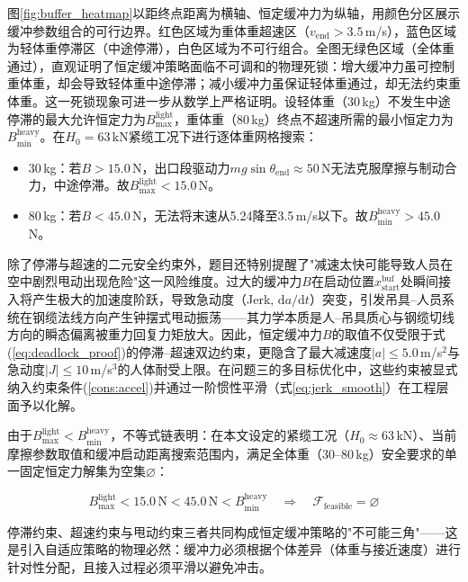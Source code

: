 \documentclass[12pt,a4paper]{ctexart}
\begin{document}
图\ref{fig:buffer_heatmap}以距终点距离为横轴、恒定缓冲力为纵轴，用颜色分区展示缓冲参数组合的可行边界。红色区域为重体重超速区（$v_{\text{end}}>3.5$\,m/s），蓝色区域为轻体重停滞区（中途停滞），白色区域为不可行组合。全图无绿色区域（全体重通过），直观证明了恒定缓冲策略面临不可调和的物理死锁：增大缓冲力虽可控制重体重，却会导致轻体重中途停滞；减小缓冲力虽保证轻体重通过，却无法约束重体重。这一死锁现象可进一步从数学上严格证明。设轻体重（30\,kg）不发生中途停滞的最大允许恒定力为$B_{\max}^{\text{light}}$，重体重（80\,kg）终点不超速所需的最小恒定力为$B_{\min}^{\text{heavy}}$。在$H_0=63$\,kN紧缆工况下进行逐体重网格搜索：

\begin{itemize}
  \item 30\,kg：若$B>15.0$\,N，出口段驱动力$mg\sin\theta_{\text{end}} \approx 50$\,N无法克服摩擦与制动合力，中途停滞。故$B_{\max}^{\text{light}} < 15.0$\,N。
  \item 80\,kg：若$B<45.0$\,N，无法将末速从5.24降至3.5\,m/s以下。故$B_{\min}^{\text{heavy}} > 45.0$\,N。
\end{itemize}

除了停滞与超速的二元安全约束外，题目还特别提醒了"减速太快可能导致人员在空中剧烈甩动出现危险"这一风险维度。过大的缓冲力$B$在启动位置$x_{\text{start}}^{\text{buf}}$处瞬间接入将产生极大的加速度阶跃，导致急动度（Jerk, $\mathrm{d}a/\mathrm{d}t$）突变，引发吊具--人员系统在钢缆法线方向产生钟摆式甩动振荡——其力学本质是人--吊具质心与钢缆切线方向的瞬态偏离被重力回复力矩放大。因此，恒定缓冲力$B$的取值不仅受限于式(\ref{eq:deadlock_proof})的停滞--超速双边约束，更隐含了最大减速度$|a|\leq 5.0$\,m/s$^2$与急动度$|J|\leq 10$\,m/s$^3$的人体耐受上限。在问题三的多目标优化中，这些约束被显式纳入约束条件(\ref{cons:accel})并通过一阶惯性平滑（式\ref{eq:jerk_smooth}）在工程层面予以化解。

由于$B_{\max}^{\text{light}} < B_{\min}^{\text{heavy}}$，不等式链表明：在本文设定的紧缆工况（$H_0\approx 63$\,kN）、当前摩擦参数取值和缓冲启动距离搜索范围内，满足全体重（30--80\,kg）安全要求的单一固定恒定力解集为空集$\varnothing$：

\begin{equation}
  B_{\max}^{\text{light}} < 15.0\,\text{N} < 45.0\,\text{N} < B_{\min}^{\text{heavy}} \quad\Rightarrow\quad \mathcal{F}_{\text{feasible}} = \varnothing
  \label{eq:deadlock_proof}
\end{equation}

停滞约束、超速约束与甩动约束三者共同构成恒定缓冲策略的"不可能三角"——这是引入自适应策略的物理必然：缓冲力必须根据个体差异（体重与接近速度）进行针对性分配，且接入过程必须平滑以避免冲击。
\end{document}
